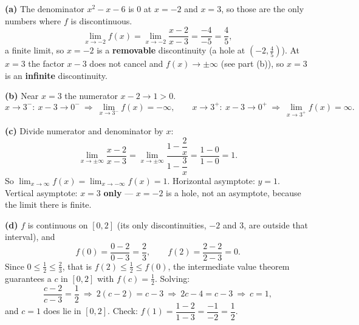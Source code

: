\documentclass[11pt]{article}
\begin{document}
\medskip
\noindent\textbf{(a)} The denominator $x^{2}-x-6$ is $0$ at $x=-2$ and $x=3$, so those are the
only numbers where $f$ is discontinuous.
\[
\lim_{x\to-2}f(x)=\lim_{x\to-2}\frac{x-2}{x-3}=\frac{-4}{-5}=\frac{4}{5},
\]
a finite limit, so $x=-2$ is a \textbf{removable} discontinuity (a hole at $\left(-2,\tfrac45\right)$).
At $x=3$ the factor $x-3$ does not cancel and $f(x)\to\pm\infty$ (see part (b)), so $x=3$ is an
\textbf{infinite} discontinuity.

\medskip
\noindent\textbf{(b)} Near $x=3$ the numerator $x-2\to1>0$.
\[
x\to3^{-}:\ x-3\to0^{-}\ \Rightarrow\ \lim_{x\to3^{-}}f(x)=-\infty,
\qquad
x\to3^{+}:\ x-3\to0^{+}\ \Rightarrow\ \lim_{x\to3^{+}}f(x)=\infty.
\]

\medskip
\noindent\textbf{(c)} Divide numerator and denominator by $x$:
\[
\lim_{x\to\pm\infty}\frac{x-2}{x-3}
=\lim_{x\to\pm\infty}\frac{1-\dfrac{2}{x}}{1-\dfrac{3}{x}}
=\frac{1-0}{1-0}=1 .
\]
So $\displaystyle\lim_{x\to\infty}f(x)=\lim_{x\to-\infty}f(x)=1$.
Horizontal asymptote: $y=1$. Vertical asymptote: $x=3$ \textbf{only} --- $x=-2$ is a hole,
not an asymptote, because the limit there is finite.

\medskip
\noindent\textbf{(d)} $f$ is continuous on $[0,2]$ (its only discontinuities, $-2$ and $3$, are
outside that interval), and
\[
f(0)=\frac{0-2}{0-3}=\frac{2}{3},\qquad f(2)=\frac{2-2}{2-3}=0 .
\]
Since $0\le\tfrac12\le\tfrac23$, that is $f(2)\le\tfrac12\le f(0)$, the intermediate value
theorem guarantees a $c$ in $[0,2]$ with $f(c)=\tfrac12$. Solving:
\[
\frac{c-2}{c-3}=\frac{1}{2}
\ \Longrightarrow\ 2(c-2)=c-3
\ \Longrightarrow\ 2c-4=c-3
\ \Longrightarrow\ c=1,
\]
and $c=1$ does lie in $[0,2]$. Check: $f(1)=\dfrac{1-2}{1-3}=\dfrac{-1}{-2}=\dfrac12$. \checkmark
\end{document}
